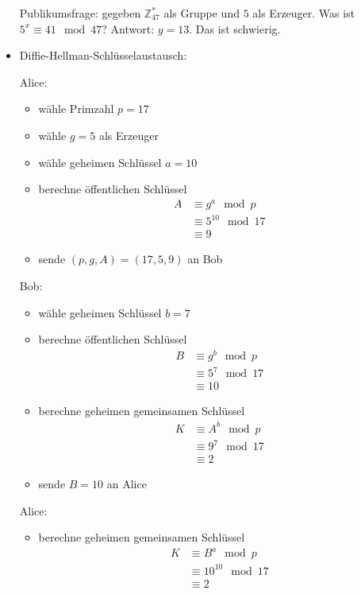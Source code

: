 \documentclass[
  a4paper,
  11pt,
]{article}
\newcommand{\Z}{\mathbb{Z}}
\begin{document}
\begin{itemize}
    Publikumsfrage: gegeben $\Z_{47}^*$ als Gruppe und $5$ als Erzeuger. Was ist
    $5^x \equiv 41 \mod 47$? Antwort: $y = 13$. Das ist schwierig.

  \item Diffie-Hellman-Schlüsselaustausch:

    Alice:
    \begin{itemize}
      \item wähle Primzahl $p = 17$
      \item wähle $g = 5$ als Erzeuger
      \item wähle geheimen Schlüssel $a = 10$
      \item berechne öffentlichen Schlüssel
        \begin{align*}
          A & \equiv g^a \mod p\\
            & \equiv 5^{10} \mod 17\\
            & \equiv 9
        \end{align*}
      \item sende $(p, g, A) = (17, 5, 9)$ an Bob
    \end{itemize}

    Bob:
    \begin{itemize}
      \item wähle geheimen Schlüssel $b = 7$
      \item berechne öffentlichen Schlüssel
        \begin{align*}
          B & \equiv g^b \mod p\\
            & \equiv 5^7 \mod 17\\
            & \equiv 10
        \end{align*}
      \item berechne geheimen gemeinsamen Schlüssel
        \begin{align*}
          K & \equiv A^b \mod p\\
            & \equiv 9^7 \mod 17\\
            & \equiv 2
        \end{align*}
      \item sende $B = 10$ an Alice
    \end{itemize}

    Alice:
    \begin{itemize}
      \item berechne geheimen gemeinsamen Schlüssel
        \begin{align*}
          K & \equiv B^a \mod p\\
            & \equiv 10^{10} \mod 17\\
            & \equiv 2
        \end{align*}
    \end{itemize}

\end{itemize}
\end{document}
